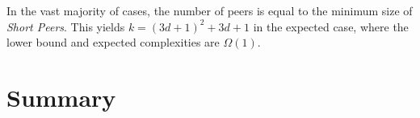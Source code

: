 In the vast majority of cases, the number of peers is equal to the minimum size of \textit{Short Peers}. 
This yields $k=(3d+1)^{2}+3d+1$ in the expected case, where the lower bound and expected complexities are $\Omega(1)$.








\section{Summary}



